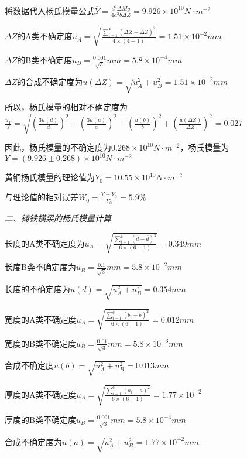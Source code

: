 \documentclass[UTF-8,twoside,cs4size]{ctexart}
\begin{document}
将数据代入杨氏模量公式$\overline Y  = \frac{{{d^3}\Delta Mg}}{{4{a^3}b\Delta Z}} = 9.926 \times {10^{10}}N \cdot {m^{ - 2}}$\par
$\Delta Z$的A类不确定度${u_A} = \sqrt {\frac{{{{\sum\limits_{i = 1}^4 {\left( {\Delta Z - \overline {\Delta Z} } \right)} }^2}}}{{4 \times \left( {4 - 1} \right)}}}  = 1.51 \times {10^{ - 2}}mm$\par
$\Delta Z$的B类不确定度${u_B} = \frac{{0.001}}{{\sqrt 3 }}mm = 5.8 \times {10^{ - 4}}mm$\par
$\Delta Z$的合成不确定度为$u\left( {\Delta Z} \right) = \sqrt {u_A^2 + u_B^2}  = 1.51\times {10^{ - 2}}mm$\par
所以，杨氏模量的相对不确定度为$\frac{{{u_Y}}}{Y} = \sqrt {{{\left( {\frac{{3u\left( d \right)}}{d}} \right)}^2} + {{\left( {\frac{{3u\left( a \right)}}{a}} \right)}^2} + {{\left( {\frac{{u\left( b \right)}}{b}} \right)}^2} + {{\left( {\frac{{u\left( {\Delta Z} \right)}}{{\Delta Z}}} \right)}^2}}  = 0.027$\par
因此，杨氏模量的不确定度为$0.268 \times {10^{ 10}}N \cdot {m^{ - 2}}$，杨氏模量为$Y = \left( {9.926 \pm 0.268} \right) \times {10^{ 10}}N \cdot {m^{ - 2}}$\par
黄铜杨氏模量的理论值为${Y_0} = 10.55 \times {10^{10}}N \cdot {m^{ - 2}}$\par
与理论值的相对误差${W_0} = \frac{{Y - {Y_0}}}{{{Y_0}}} = 5.9\% $

\textit{二、铸铁横梁的杨氏模量计算}

长度的A类不确定度为${u_A} = \sqrt {\frac{{\sum\limits_{i = 1}^6 {{{\left( {d - \overline d } \right)}^2}} }}{{6 \times \left( {6 - 1} \right)}}}  = 0.349mm$\par
长度B类不确定度为$ {u_B} = \frac{{0.1}}{{\sqrt 3 }}mm=5.8 \times {10^{ - 2}}mm$ \par
长度的不确定度为$u\left( d \right) = \sqrt {u_A^2 + u_B^2}  = 0.354mm$\par
宽度的A类不确定度${u_A} = \sqrt {\frac{{\sum\limits_{i = 1}^6 {{{\left( {{b_i} - \overline b } \right)}^2}} }}{{6 \times \left( {6 - 1} \right)}}}  = 0.012mm$\par
宽度的B类不确定度${u_B} = \frac{{0.01}}{{\sqrt 3 }}mm = 5.8 \times {10^{ - 3}}mm$\par
合成不确定度$u\left( b \right) = \sqrt {u_A^2 + u_B^2}  = 0.013mm$\par
厚度的A类不确定度${u_A} = \sqrt {\frac{{\sum\limits_{i = 1}^6 {{{\left( {{a_i} - \overline a } \right)}^2}} }}{{6 \times \left( {6 - 1} \right)}}}  = 1.77 \times {10^{ - 2}}$\par
厚度的B类不确定度${u_B} = \frac{{0.001}}{{\sqrt 3 }}mm = 5.8 \times {10^{ - 4}}mm$\par
合成不确定度为$u\left( a \right) = \sqrt {u_A^2 + u_B^2}  = 1.77 \times {10^{ - 2}}mm$
\end{document}
